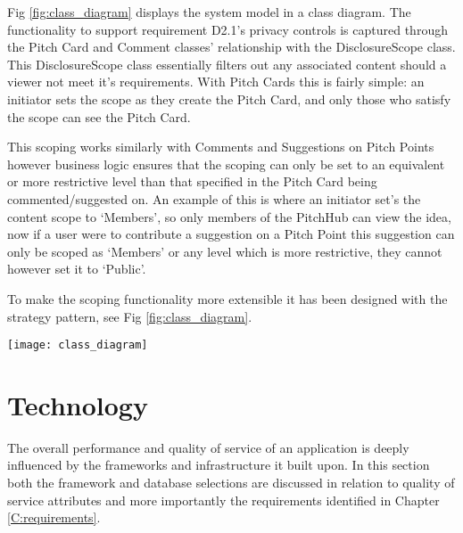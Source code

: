 Fig \ref{fig:class_diagram} displays the system model in a class diagram. The functionality to support requirement D2.1's privacy controls is captured through the Pitch Card and Comment classes' relationship with the DisclosureScope class. This DisclosureScope class essentially filters out any associated content should a viewer not meet it's requirements. With Pitch Cards this is fairly simple: an initiator sets the scope as they create the Pitch Card, and only those who satisfy the scope can see the Pitch Card.

This scoping works similarly with Comments and Suggestions on Pitch Points however business logic ensures that the  scoping can only be set to an equivalent or more restrictive level than that specified in the Pitch Card being commented/suggested on. An example of this is where an initiator set's the content scope to `Members', so only members of the PitchHub can view the idea, now if a user were to contribute a suggestion on a Pitch Point this suggestion can only be scoped as `Members' or any level which is more restrictive, they cannot however set it to `Public'. 

To make the scoping functionality more extensible it has been designed with the strategy pattern, see Fig \ref{fig:class_diagram}.
 
\begin{sidewaysfigure}[ht]
    \centering
    \texttt{[image: class\_diagram]}
    \caption{PitchHub's system structure as represented in a class diagram. Of note is the Pitch Card and Comment classes and their relationship to the DisclosureScopes. This relationship describes the Pitch Card and Comment classes ability to scope the visibility of their content. (NB: Some attributes were left out for the sake of brevity e.g. Pitch Cards have an `images' attribute)}
    \label{fig:class_diagram}
\end{sidewaysfigure}

\section{Technology}

The overall performance and quality of service of an application is deeply influenced by the frameworks and infrastructure it built upon. In this section both the framework and database selections are discussed in relation to quality of service attributes and more importantly the requirements identified in Chapter \ref{C:requirements}.

